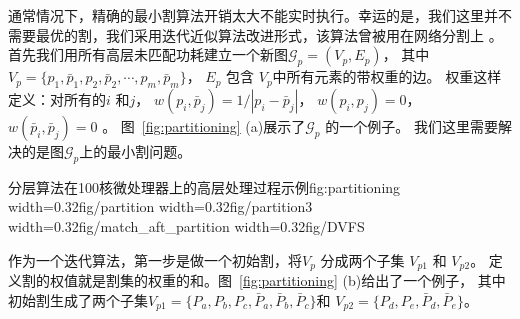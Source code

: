 通常情况下，精确的最小割算法开销太大不能实时执行。幸运的是，我们这里并不需要最优的割，我们采用迭代近似算法改进形式，该算法曾被用在网络分割上 \cite{Fidducia:DAC'82} 。
首先我们用所有高层未匹配功耗建立一个新图$\mathcal{G}_p = (V_p, E_p)$，
其中 $V_p=\{p_1, \bar{p}_1, p_2, \bar{p}_2, \cdots, p_m, \bar{p}_m\}$， 
$E_p$ 包含 $V_p$中所有元素的带权重的边。
权重这样定义：对所有的$i$ 和$j$， $w(p_i, \bar{p}_j) = 1/|p_i-\bar{p}_j|$，
$w(p_i, p_j) = 0$， $w(\bar{p}_i, \bar{p}_j) = 0$  。
图~\ref{fig:partitioning} (a)展示了$\mathcal{G}_p$ 的一个例子。 
我们这里需要解决的是图$\mathcal{G}_p$上的最小割问题。 

\begin{pics}{分层算法在100核微处理器上的高层处理过程示例}{fig:partitioning}
  \centering
  {width=0.32\columnwidth}{fig/partition}
  {width=0.32\columnwidth}{fig/partition3}
  {width=0.32\columnwidth}{fig/match_aft_partition}
  {width=0.32\columnwidth}{fig/DVFS}
\end{pics}

作为一个迭代算法，第一步是做一个初始割，将$V_p$ 分成两个子集 $V_{p1}$ 和 $V_{p2}$。
定义割的权值就是割集的权重的和。图~\ref{fig:partitioning} (b)给出了一个例子，
其中初始割生成了两个子集$V_{p1}=\{P_a, P_b, P_c, \bar{P}_a,
  \bar{P}_b, \bar{P}_c\}$和 $V_{p2}=\{P_d, P_e, \bar{P}_d,
  \bar{P}_e\}$。
  
